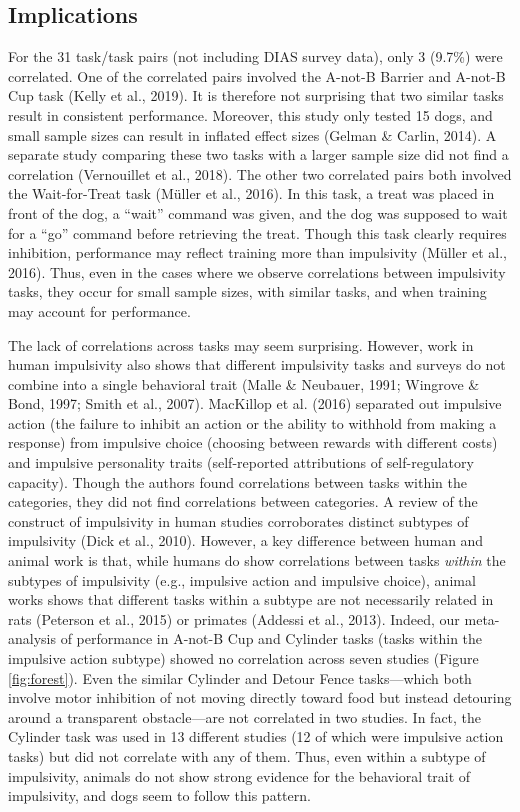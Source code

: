 \documentclass[
  ,pub,floatsintext]{apa6}
\begin{document}
\hypertarget{implications}{%
\subsection{Implications}\label{implications}}

For the 31 task/task pairs (not including DIAS survey data), only 3 (9.7\%) were correlated. One of the correlated pairs involved the A-not-B Barrier and A-not-B Cup task (Kelly et al., 2019). It is therefore not surprising that two similar tasks result in consistent performance. Moreover, this study only tested 15 dogs, and small sample sizes can result in inflated effect sizes (Gelman \& Carlin, 2014). A separate study comparing these two tasks with a larger sample size did not find a correlation (Vernouillet et al., 2018). The other two correlated pairs both involved the Wait-for-Treat task (Müller et al., 2016). In this task, a treat was placed in front of the dog, a ``wait'' command was given, and the dog was supposed to wait for a ``go'' command before retrieving the treat. Though this task clearly requires inhibition, performance may reflect training more than impulsivity (Müller et al., 2016). Thus, even in the cases where we observe correlations between impulsivity tasks, they occur for small sample sizes, with similar tasks, and when training may account for performance.

The lack of correlations across tasks may seem surprising. However, work in human impulsivity also shows that different impulsivity tasks and surveys do not combine into a single behavioral trait (Malle \& Neubauer, 1991; Wingrove \& Bond, 1997; Smith et al., 2007). MacKillop et al. (2016) separated out impulsive action (the failure to inhibit an action or the ability to withhold from making a response) from impulsive choice (choosing between rewards with different costs) and impulsive personality traits (self-reported attributions of self-regulatory capacity). Though the authors found correlations between tasks within the categories, they did not find correlations between categories. A review of the construct of impulsivity in human studies corroborates distinct subtypes of impulsivity (Dick et al., 2010). However, a key difference between human and animal work is that, while humans do show correlations between tasks \emph{within} the subtypes of impulsivity (e.g., impulsive action and impulsive choice), animal works shows that different tasks within a subtype are not necessarily related in rats (Peterson et al., 2015) or primates (Addessi et al., 2013). Indeed, our meta-analysis of performance in A-not-B Cup and Cylinder tasks (tasks within the impulsive action subtype) showed no correlation across seven studies (Figure \ref{fig:forest}). Even the similar Cylinder and Detour Fence tasks---which both involve motor inhibition of not moving directly toward food but instead detouring around a transparent obstacle---are not correlated in two studies. In fact, the Cylinder task was used in 13 different studies (12 of which were impulsive action tasks) but did not correlate with any of them. Thus, even within a subtype of impulsivity, animals do not show strong evidence for the behavioral trait of impulsivity, and dogs seem to follow this pattern.
\end{document}
